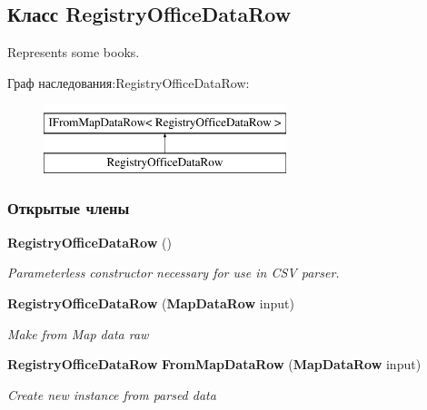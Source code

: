 \subsection{Класс Registry\+Office\+Data\+Row}
\label{classkdz__manager_1_1_registry_office_data_row}


Represents some books.  


Граф наследования\+:Registry\+Office\+Data\+Row\+:\begin{figure}[H]
\begin{center}
\leavevmode
\includegraphics[height=2.000000cm]{classkdz__manager_1_1_registry_office_data_row}
\end{center}
\end{figure}
\subsubsection*{Открытые члены}
\begin{DoxyCompactItemize}
\item 
{\bf Registry\+Office\+Data\+Row} ()
\begin{DoxyCompactList}\small\item\em Parameterless constructor necessary for use in C\+S\+V parser. \end{DoxyCompactList}\item 
{\bf Registry\+Office\+Data\+Row} ({\bf Map\+Data\+Row} input)
\begin{DoxyCompactList}\small\item\em Make from Map data raw \end{DoxyCompactList}\item 
{\bf Registry\+Office\+Data\+Row} {\bf From\+Map\+Data\+Row} ({\bf Map\+Data\+Row} input)
\begin{DoxyCompactList}\small\item\em Create new instance from parsed data \end{DoxyCompactList}\end{DoxyCompactItemize}
